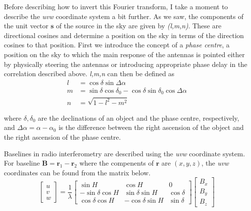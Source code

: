 Before describing how to invert this Fourier transform, I take a moment to describe the \textit{uvw} coordinate system a bit further.
As we saw, the components of the unit vector $\mathbf{s}$ of the source in the sky are given by \textit{(l,m,n)}. These are directional cosines and determine a position on the sky in terms of the direction cosines to that position. First we introduce the concept of a \textit{phase centre}, a position on the sky to which the main response of the antennas is pointed either by physically steering the antennas or introducing appropriate phase delay in the correlation described above.
\textit{l,m,n} can then be defined as
\begin{align*}
l &= \cos \delta  \sin \Delta \alpha \\ 
m &= \sin \delta \cos \delta_0 - \cos \delta \sin \delta_0 \cos\Delta \alpha \\ 
n &= \sqrt{1-l^2-m^2}
\end{align*}

where $\delta, \delta_0$ are the declinations of an object and the phase centre, respectively, and $\Delta \alpha = \alpha -\alpha_0$ is the difference between the right ascension of the object and the right ascension of the phase centre.



Baselines in radio interferometry are described using the \textit{uvw} coordinate system. For baseline $\mathbf{B} = \mathbf{r}_1 - \mathbf{r}_2$ where the compenents of $\mathbf{r}$ are $(x,y,z)$, the \textit{uvw} coordinates can be found from the matrix below.
\[
\begin{bmatrix}
    u \\
    v \\
    w
\end{bmatrix}
=
\dfrac{1}{\lambda}
\begin{bmatrix}
    \sin H       & \cos H & 0 \\
    -\sin \delta \cos H       & \sin \delta \sin H & \cos \delta \\
    \cos \delta \cos H       & -\cos \delta \sin H & \sin \delta
    

\end{bmatrix}
%
\begin{bmatrix}
    B_x \\
    B_y \\
    B_z
    

\end{bmatrix}
\]

